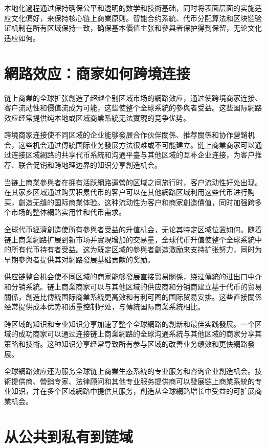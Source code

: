 \documentclass[
  Letterpaper,
]{scrbook}
\begin{document}
本地化過程通过保持确保公平和透明的数学和技術基础，同时将表面层面的实施适应文化偏好，来保持核心链上商業原则。智能合约系統、代币分配算法和区块链验证机制在所有区域保持一致，确保基本價值主张和參與者保护得到保留，无论文化适应如何。

\section{網路效应：商家如何跨境连接}\label{ux7db2ux8defux6548ux5e94ux5546ux5bb6ux5982ux4f55ux8de8ux5883ux8fdeux63a5}

链上商業的全球扩张創造了超越个别区域市场的網路效应，通过使跨境商家连接、客户流动性和價值流成为可能，这些使整个全球系統的參與者受益。这些国际網路效应经常提供纯本地或区域商業系統无法實現的竞争优势。

跨境商家连接使不同区域的企业能够發展合作伙伴關係、推荐關係和协作營銷机会，这些机会通过傳統国际业务發展方法很难或不可能建立。链上商業商家可以通过连接区域網路的共享代币系統和沟通平臺与其他区域的互补企业连接，为客户推荐、联合促销和跨地理边界的知识分享創造机会。

当链上商業參與者在拥有活跃網路運營的区域之间旅行时，客户流动性好处出现。在其家乡区域通过购买积累代币的客户可以在其他網路区域利用这些代币进行购买，創造无缝的国际商業体验。这种流动性为客户和商家創造價值，同时加强跨多个市场的整体網路实用性和代币需求。

全球代币經濟創造使所有參與者受益的升值机会，无论其特定区域位置如何。随着链上商業網路扩展到新市场并實現增加的交易量，全球代币升值使整个全球系統中的所有代币持有者受益。这为既定区域的參與者創造激励来支持扩张努力，同时为早期參與者提供其对網路發展基础贡献的奖励。

供应链整合机会使不同区域的商家能够發展直接贸易關係，绕过傳統的进出口中介和分销系統。链上商業商家可以与其他区域的供应商和分销商建立基于代币的贸易關係，創造比傳統国际商業系統更高效和有利可图的国际贸易安排。这些直接關係经常提供成本优势和质量控制好处，与傳統国际商業系統相比。

跨区域的知识和专业知识分享加速了整个全球網路的創新和最佳实践發展。一个区域的成功商家可以通过连接链上商業網路的全球沟通系統与其他区域的商家分享其策略和技術。这种知识分享经常导致所有参与区域的改善业务绩效和更快網路發展。

全球網路效应还为服务全球链上商業生态系統的专业服务和咨询企业創造机会。技術提供商、營銷专家、法律顾问和其他专业服务提供商可以發展链上商業系統的专业知识，并在多个区域網路中提供其服务，創造从全球網路增长中受益的可扩展商業机会。

\section{从公共到私有到链域}\label{ux4eceux516cux5171ux5230ux79c1ux6709ux5230ux94feux57df}
\end{document}

